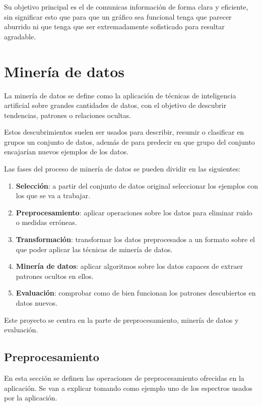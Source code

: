 Su objetivo principal es el de comunicas información de forma clara y eficiente,
sin significar esto que para que un gráfico sea funcional tenga que parecer
aburrido ni que tenga que ser extremadamente sofisticado para resultar
agradable\cite{friedman2008}.

\section{Minería de datos}

La minería de datos se define como la aplicación de técnicas de inteligencia
artificial sobre grandes cantidades de datos, con el objetivo de descubrir
tendencias, patrones o relaciones ocultas.

Estos descubrimientos suelen ser usados para describir, resumir o clasificar en
grupos un conjunto de datos, además de para predecir en que grupo del conjunto
encajarían nuevos ejemplos de los datos.

Las fases del proceso de minería de datos se pueden dividir en las siguientes:
\begin{enumerate}
	\item \textbf{Selección}: a partir del conjunto de datos original seleccionar
	los ejemplos con los que se va a trabajar.
	\item \textbf{Preprocesamiento}: aplicar operaciones sobre los datos para
	eliminar ruido o medidas erróneas.
	\item \textbf{Transformación}: transformar los datos preprocesados a un formato
	sobre el que poder aplicar las técnicas de minería de datos.
	\item \textbf{Minería de datos}: aplicar algoritmos sobre los datos capaces de
	extraer patrones ocultos en ellos.
	\item \textbf{Evaluación}: comprobar como de bien funcionan los patrones
	descubiertos en datos nuevos.
\end{enumerate}

Este proyecto se centra en la parte de preprocesamiento, minería de datos y
evaluación.

\subsection{Preprocesamiento}

En esta sección se definen las operaciones de preprocesamiento ofrecidas en la
aplicación. Se van a explicar tomando como ejemplo uno de los espectros usados
por la aplicación.

